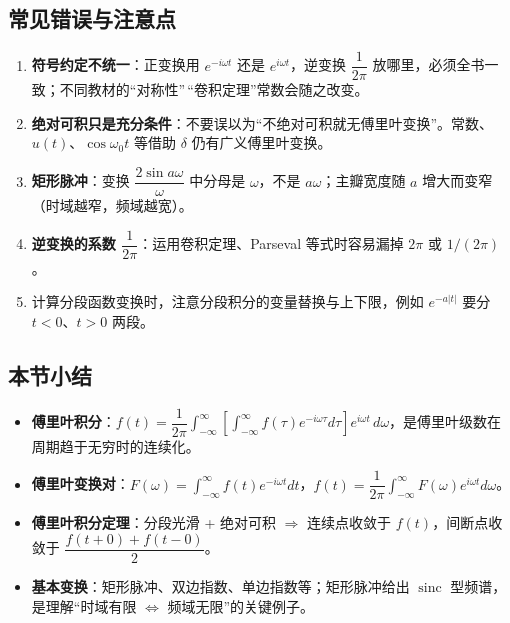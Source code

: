 \subsection{常见错误与注意点}\label{ux5e38ux89c1ux9519ux8befux4e0eux6ce8ux610fux70b9-17}

\begin{enumerate}
\def\labelenumi{\arabic{enumi}.}
\tightlist
\item
  \textbf{符号约定不统一}：正变换用 \(e^{-i\omega t}\) 还是
  \(e^{i\omega t}\)，逆变换 \(\dfrac{1}{2\pi}\)
  放哪里，必须全书一致；不同教材的``对称性''\,``卷积定理''常数会随之改变。
\item
  \textbf{绝对可积只是充分条件}：不要误以为``不绝对可积就无傅里叶变换''。常数、\(u(t)\)、\(\cos\omega_0 t\)
  等借助 \(\delta\) 仍有广义傅里叶变换。
\item
  \textbf{矩形脉冲}：变换 \(\dfrac{2\sin a\omega}{\omega}\) 中分母是
  \(\omega\)，不是 \(a\omega\)；主瓣宽度随 \(a\)
  增大而变窄（时域越窄，频域越宽）。
\item
  \textbf{逆变换的系数 \(\dfrac{1}{2\pi}\)}：运用卷积定理、Parseval
  等式时容易漏掉 \(2\pi\) 或 \(1/(2\pi)\)。
\item
  计算分段函数变换时，注意分段积分的变量替换与上下限，例如 \(e^{-a|t|}\)
  要分 \(t<0\)、\(t>0\) 两段。
\end{enumerate}

\subsection{本节小结}\label{ux672cux8282ux5c0fux7ed3-17}

\begin{itemize}
\tightlist
\item
  \textbf{傅里叶积分}：\(f(t)=\dfrac{1}{2\pi}\int_{-\infty}^{\infty}\left[\int_{-\infty}^{\infty}f(\tau)e^{-i\omega\tau}d\tau\right]e^{i\omega t}\,d\omega\)，是傅里叶级数在周期趋于无穷时的连续化。
\item
  \textbf{傅里叶变换对}：\(F(\omega)=\int_{-\infty}^{\infty}f(t)e^{-i\omega t}dt\)，\(f(t)=\dfrac{1}{2\pi}\int_{-\infty}^{\infty}F(\omega)e^{i\omega t}d\omega\)。
\item
  \textbf{傅里叶积分定理}：分段光滑 + 绝对可积 \(\Rightarrow\)
  连续点收敛于 \(f(t)\)，间断点收敛于 \(\dfrac{f(t+0)+f(t-0)}{2}\)。
\item
  \textbf{基本变换}：矩形脉冲、双边指数、单边指数等；矩形脉冲给出
  \(\operatorname{sinc}\) 型频谱，是理解``时域有限
  \(\Longleftrightarrow\) 频域无限''的关键例子。
\end{itemize}

